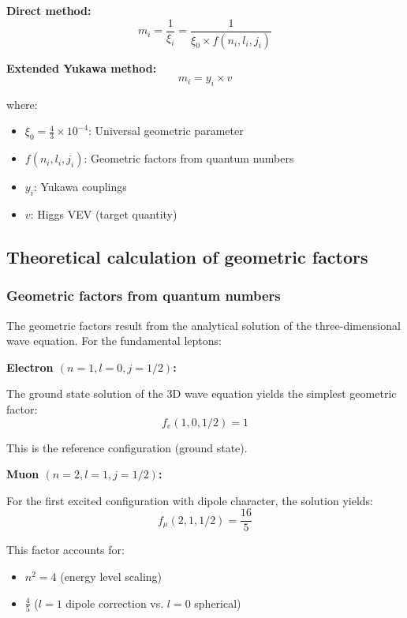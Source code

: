 \documentclass[12pt,a4paper]{article}
\begin{document}
\textbf{Direct method:}
\begin{equation}
	m_i = \frac{1}{\xi_i} = \frac{1}{\xi_0 \times f(n_i, l_i, j_i)}
	\label{eq:direct_mass_formula}
\end{equation}

\textbf{Extended Yukawa method:}
\begin{equation}
	m_i = y_i \times v
	\label{eq:yukawa_mass_formula}
\end{equation}

where:
\begin{itemize}
	\item $\xi_0 = \frac{4}{3} \times 10^{-4}$: Universal geometric parameter
	\item $f(n_i, l_i, j_i)$: Geometric factors from quantum numbers
	\item $y_i$: Yukawa couplings
	\item $v$: Higgs VEV (target quantity)
\end{itemize}

\subsection{Theoretical calculation of geometric factors}

\subsubsection{Geometric factors from quantum numbers}

The geometric factors result from the analytical solution of the three-dimensional wave equation. For the fundamental leptons:

\textbf{Electron $(n=1, l=0, j=1/2)$:}

The ground state solution of the 3D wave equation yields the simplest geometric factor:
\begin{equation}
	f_e(1,0,1/2) = 1
\end{equation}

This is the reference configuration (ground state).

\textbf{Muon $(n=2, l=1, j=1/2)$:}

For the first excited configuration with dipole character, the solution yields:
\begin{equation}
	f_\mu(2,1,1/2) = \frac{16}{5}
\end{equation}

This factor accounts for:
\begin{itemize}
	\item $n^2 = 4$ (energy level scaling)
	\item $\frac{4}{5}$ ($l=1$ dipole correction vs. $l=0$ spherical)
\end{itemize}
\end{document}
